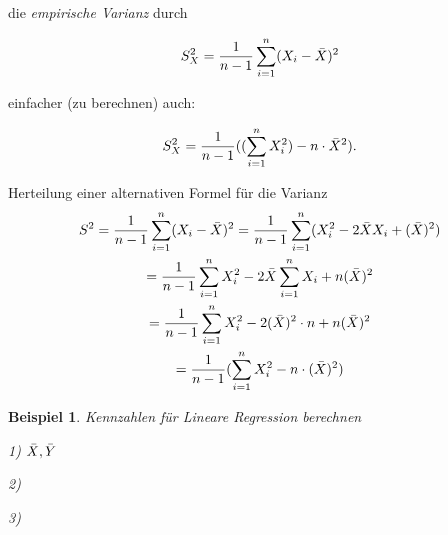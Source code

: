 \documentclass{tufte-handout}
\theoremstyle{own}
\newtheorem{example}{Beispiel}[]
\begin{document}
die \emph{empirische Varianz} durch

\begin{equation}
S_X^2 = \frac{1}{n-1} \sum_{i=1}^n (X_i - \Bar{X})^2
\end{equation}

einfacher (zu berechnen) auch:

\begin{equation}
S_X^2 = \frac{1}{n-1} ((\sum_{i=1}^n X_i^2) - n \cdot \Bar{X}^2).
\end{equation}

Herteilung einer alternativen Formel für die Varianz
\begin{gather}
S^2 = \frac{1}{n-1} \sum_{i=1}^n (X_i - \Bar{X})^2
= \frac{1}{n-1} \sum_{i=1}^n (X_i^2 - 2\Bar{X}X_i + (\Bar{X})^2 ) \\
= \frac{1}{n-1} \sum_{i=1}^n X_i^2 - 2\Bar{X} \sum_{i=1}^n X_i + n (\Bar{X})^2 \\
= \frac{1}{n-1} \sum_{i=1}^n X_i^2 - 2 (\Bar{X})^2 \cdot n + n (\Bar{X})^2 \\
= \frac{1}{n-1} (\sum_{i=1}^n X_i^2 - n \cdot (\Bar{X})^2 )
\end{gather}

\begin{example} Kennzahlen für Lineare Regression berechnen

1) $\Bar{X}, \Bar{Y}$

2)

3)

\end{example}



\end{document}
